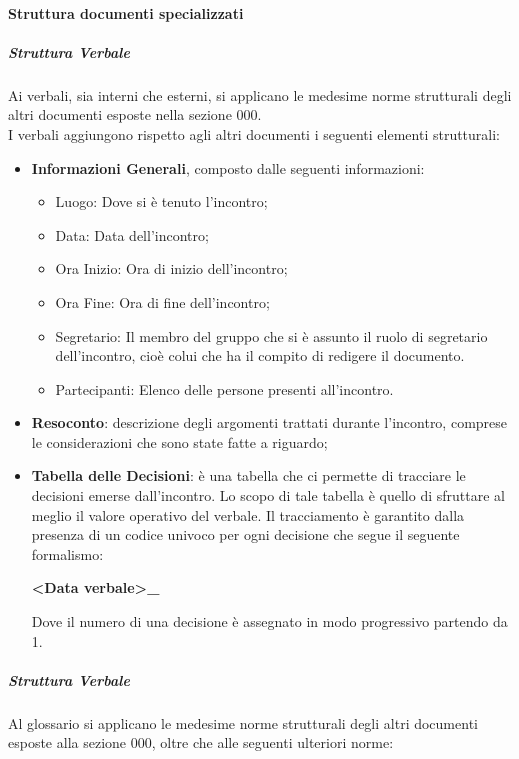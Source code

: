 			\paragraph{Struttura documenti specializzati}
				\subparagraph{Struttura Verbale}
					Ai verbali, sia interni che esterni, si applicano le medesime norme strutturali degli altri documenti esposte nella sezione 000. \\
					I verbali aggiungono rispetto agli altri documenti i seguenti elementi strutturali:
					\begin{itemize}
						\item\textbf{Informazioni Generali}, composto dalle seguenti informazioni:
							\begin{itemize}
								\item Luogo: Dove si è tenuto l’incontro;
								\item Data: Data dell’incontro;
								\item Ora Inizio: Ora di inizio dell’incontro;
								\item Ora Fine: Ora di fine dell’incontro;
								\item Segretario: Il membro del gruppo che si è assunto il ruolo di segretario dell’incontro, cioè colui che ha il compito di redigere il documento.
								\item Partecipanti: Elenco delle persone presenti all’incontro.
							\end{itemize}
						\item\textbf{Resoconto}: descrizione degli argomenti trattati durante l’incontro, comprese le considerazioni che sono state fatte a riguardo;
						\item\textbf{Tabella delle Decisioni}: è una tabella che ci permette di tracciare le decisioni emerse dall’incontro. Lo scopo di tale tabella è quello di sfruttare al meglio il valore operativo del verbale. Il tracciamento è garantito dalla presenza di un codice univoco per ogni decisione che segue il seguente formalismo: \\
							\begin{center}
								\textbf{<Data verbale>\_<Numero decisione>}
							\end{center}
							Dove il numero di una decisione è assegnato in modo progressivo partendo da 1.
					\end{itemize}
				\subparagraph{Struttura Verbale}
					Al glossario si applicano le medesime norme strutturali degli altri documenti esposte alla sezione 000, oltre che alle seguenti ulteriori norme:\\
